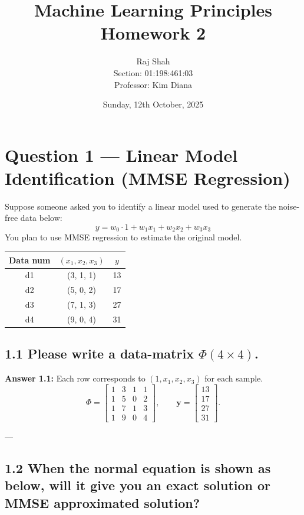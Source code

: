 \documentclass[12pt]{article}
\title{\textbf{Machine Learning Principles}\\[0.4cm]
Homework 2}
\author{Raj Shah \\ Section: 01:198:461:03 \\ Professor: Kim Diana}
\date{Sunday, 12th October, 2025}
\begin{document}
\maketitle

\newpage
\section*{Question 1 — Linear Model Identification (MMSE Regression)}

Suppose someone asked you to identify a linear model used to generate the noise-free data below:
\[
y = w_0 \cdot 1 + w_1x_1 + w_2x_2 + w_3x_3
\]
You plan to use MMSE regression to estimate the original model.

\begin{center}
\begin{tabular}{ccc}
\toprule
\textbf{Data num} & $(x_1, x_2, x_3)$ & $y$ \\
\midrule
d1 & (3, 1, 1) & 13 \\
d2 & (5, 0, 2) & 17 \\
d3 & (7, 1, 3) & 27 \\
d4 & (9, 0, 4) & 31 \\
\bottomrule
\end{tabular}
\end{center}

\subsection*{1.1
Please write a data-matrix $\Phi(4\times4)$.}
\textbf{Answer 1.1:}  
Each row corresponds to $(1, x_1, x_2, x_3)$ for each sample.
\[
\Phi =
\begin{bmatrix}
1 & 3 & 1 & 1\\
1 & 5 & 0 & 2\\
1 & 7 & 1 & 3\\
1 & 9 & 0 & 4
\end{bmatrix},
\qquad
\mathbf y =
\begin{bmatrix}
13\\17\\27\\31
\end{bmatrix}.
\]

---

\subsection*{1.2
When the normal equation is shown as below, will it give you an exact solution or MMSE approximated solution?}
\end{document}
